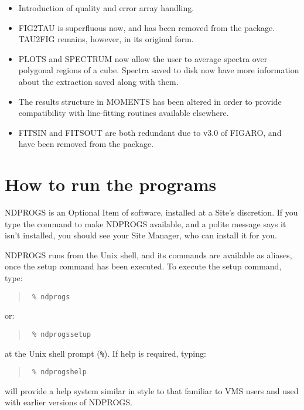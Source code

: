 \begin{itemize}

\item Introduction of quality and error array handling.

\item FIG2TAU is superfluous now, and has been removed from the
package.  TAU2FIG remains, however, in its original form.

\item PLOTS and SPECTRUM now allow the user to average spectra over
polygonal regions of a cube. Spectra saved to disk now have more
information about the extraction saved along with them.

\item The results structure in MOMENTS has been altered in order to
provide compatibility with line-fitting routines available elsewhere.

\item FITSIN and FITSOUT are both redundant due to v3.0 of FIGARO, and
have been removed from the package.

\end{itemize}

\section{How to run the programs{}}
\label{sec:run}

NDPROGS is an Optional Item of software, installed at a
Site's discretion. If you type the command to make NDPROGS available, and
a polite message says it isn't installed, you should see your Site
Manager, who can install it for you.

NDPROGS runs from the Unix shell, and its commands are available as
aliases, once the setup command has been executed.  To execute the
setup command, type:

\begin{quote}\tt
\% ndprogs
\end{quote}

or:

\begin{quote}\tt
\% ndprogssetup
\end{quote}

at the Unix shell prompt ({\tt \%}). If help is required, typing:

\begin{quote}\tt
\% ndprogshelp
\end{quote}

will provide a help system similar in style to that familiar to
VMS users and used with earlier versions of NDPROGS.


